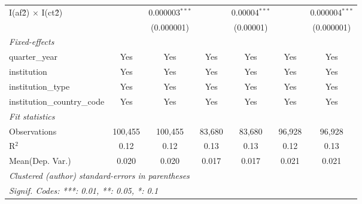 \begin{tabular}{lcccccc}
   I(af\^2) $\times$ I(ct\^2)         &               & 0.000003$^{***}$ &               & 0.00004$^{***}$ &               & 0.000004$^{***}$\\   
                                      &               & (0.000001)       &               & (0.00001)       &               & (0.000001)\\   
   \midrule
   \emph{Fixed-effects}\\
   quarter\_year                      & Yes           & Yes              & Yes           & Yes             & Yes           & Yes\\  
   institution                        & Yes           & Yes              & Yes           & Yes             & Yes           & Yes\\  
   institution\_type                  & Yes           & Yes              & Yes           & Yes             & Yes           & Yes\\  
   institution\_country\_code         & Yes           & Yes              & Yes           & Yes             & Yes           & Yes\\  
   \midrule
   \emph{Fit statistics}\\
   Observations                       & 100,455       & 100,455          & 83,680        & 83,680          & 96,928        & 96,928\\  
   R$^2$                              & 0.12          & 0.12             & 0.13          & 0.13            & 0.12          & 0.13\\  
Mean(Dep. Var.) & 0.020 & 0.020 & 0.017 & 0.017 & 0.021 & 0.021 \\
   \midrule \midrule
   \multicolumn{7}{l}{\emph{Clustered (author) standard-errors in parentheses}}\\
   \multicolumn{7}{l}{\emph{Signif. Codes: ***: 0.01, **: 0.05, *: 0.1}}\\
\end{tabular}
\par\endgroup
